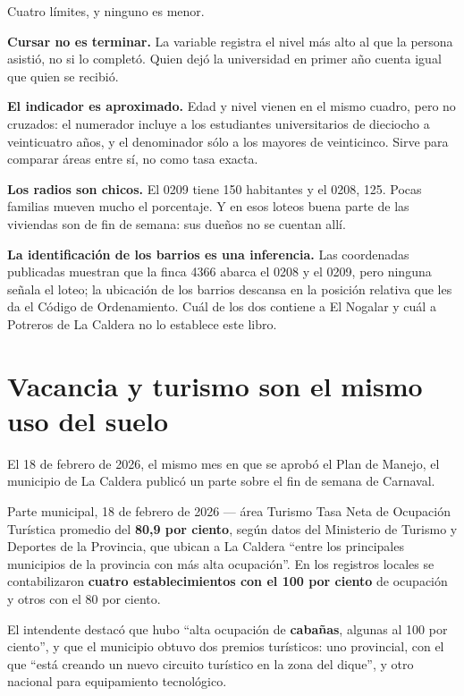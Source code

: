 \begin{cautela}
Cuatro límites, y ninguno es menor.

\textbf{Cursar no es terminar.} La variable registra el nivel más alto al que la persona asistió, no si lo completó. Quien dejó la universidad en primer año cuenta igual que quien se recibió.

\textbf{El indicador es aproximado.} Edad y nivel vienen en el mismo cuadro, pero no cruzados: el numerador incluye a los estudiantes universitarios de dieciocho a veinticuatro años, y el denominador sólo a los mayores de veinticinco. Sirve para comparar áreas entre sí, no como tasa exacta.

\textbf{Los radios son chicos.} El 0209 tiene 150 habitantes y el 0208, 125. Pocas familias mueven mucho el porcentaje. Y en esos loteos buena parte de las viviendas son de fin de semana: sus dueños no se cuentan allí.

\textbf{La identificación de los barrios es una inferencia.} Las coordenadas publicadas muestran que la finca 4366 abarca el 0208 y el 0209, pero ninguna señala el loteo; la ubicación de los barrios descansa en la posición relativa que les da el Código de Ordenamiento. Cuál de los dos contiene a El Nogalar y cuál a Potreros de La Caldera no lo establece este libro.
\end{cautela}

\section{Vacancia y turismo son el mismo uso del suelo}

El 18 de febrero de 2026, el mismo mes en que se aprobó el Plan de Manejo, el municipio de La Caldera publicó un parte sobre el fin de semana de Carnaval.

\begin{ficha}{Parte municipal, 18 de febrero de 2026 --- área Turismo}
Tasa Neta de Ocupación Turística promedio del \textbf{80,9 por ciento}, según datos del Ministerio de Turismo y Deportes de la Provincia, que ubican a La Caldera ``entre los principales municipios de la provincia con más alta ocupación''. En los registros locales se contabilizaron \textbf{cuatro establecimientos con el 100 por ciento} de ocupación y otros con el 80 por ciento.

El intendente destacó que hubo ``alta ocupación de \textbf{cabañas}, algunas al 100 por ciento'', y que el municipio obtuvo dos premios turísticos: uno provincial, con el que ``está creando un nuevo circuito turístico en la zona del dique'', y otro nacional para equipamiento tecnológico.
\end{ficha}

